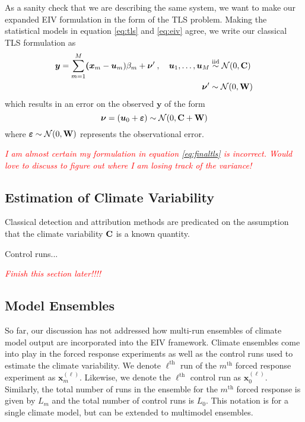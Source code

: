 \documentclass[11pt]{article}
\newcommand{\C}{\ensuremath{\text{Cov}}}
\def\*#1{\bm{#1}}
\def\C{\textbf{\text{C}}}
\def\W{\textbf{\text{W}}}
\begin{document}
As a sanity check that we are describing the same system, we want to make our expanded EIV formulation in the form of the TLS problem. Making the statistical models in equation \ref{eq:tls} and \ref{eq:eiv} agree, we write our classical TLS formulation as
\begin{align} \label{eq:finaltls}
\*y = \sum_{m=1}^M \*(\*x_m - \*u_m) \beta_m + \*\nu' \: , \quad \*u_1,\dots,\*u_M &\stackrel{\text{iid}}{\sim} \mathcal{N}(0,\C) \\
\*\nu'&\sim \mathcal{N}(0,\W) \nonumber
\end{align}
which results in an error on the observed $\*y$ of the form
\[
\*\nu = ( \*u_0 + \*\varepsilon)  \sim \mathcal{N}(0,\C+\W)
\]
where $\*\varepsilon \sim \mathcal{N}(0,\W)$ represents the observational error. 

\textcolor{red}{\emph{I am almost certain my formulation in equation \ref{eq:finaltls} is incorrect. Would love to discuss to figure out where I am losing track of the variance!}}

\newpage
\subsection{Estimation of Climate Variability}
Classical detection and attribution methods are predicated on the assumption that the climate variability $\C$ is a known quantity. 

Control runs...

\textcolor{red}{\emph{Finish this section later!!!!}}
\subsection{Model Ensembles}
So far, our discussion has not addressed how multi-run ensembles of climate model output are incorporated into the EIV framework. Climate ensembles come into play in the forced response experiments as well as the control runs used to estimate the climate variability. We denote  $\ell^{\text{th}}$ run of the $m^{\text{th}}$ forced response experiment as $\*x_m^{(\ell)}$. Likewise, we denote the $\ell^{\text{th}}$ control run as $\*x_0^{(\ell)}$. Similarly, the total number of runs in the ensemble for the $m^{\text{th}}$ forced response is given by $L_m$ and the total number of control runs is $L_0$. This notation is for a single climate model, but can be extended to multimodel ensembles.
\end{document}
